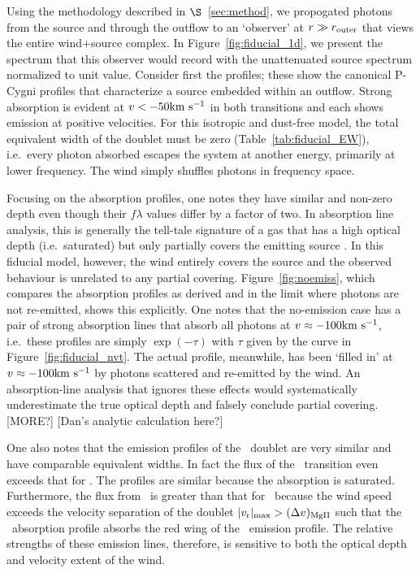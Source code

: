 \documentclass[12pt,preprint]{aastex}
\begin{document}
{Using the methodology described in $\S$~\ref{sec:method}, we
propogated photons from the source and through the outflow to an
`observer' at $r \gg r_{\rm outer}$ that views the entire wind+source
complex.  In Figure~\ref{fig:fiducial_1d}, we present the spectrum
that this observer would record with the unattenuated source spectrum
normalized to unit value.   Consider first the  profiles;
these show the canonical P-Cygni profiles that characterize a 
source embedded within an outflow.  Strong absorption is evident at
$v < -50 {\rm km~s^{-1}}$ in both transitions and each shows emission at
positive velocities.  For this isotropic and dust-free model, the
total equivalent width of the doublet must be zero
(Table~\ref{tab:fiducial_EW}), i.e.\ every photon
absorbed escapes the system at another energy, primarily at lower
frequency.  The wind simply shuffles photons in frequency space.

Focusing on the  absorption profiles, one notes they have
similar and non-zero depth even though their $f\lambda$ values differ
by a factor of two.  In absorption line analysis, this is generally
the tell-tale signature of a gas that has a high optical depth (i.e.\
saturated) but only partially covers the emitting source
\citep[e.g.][]{hamman10}.  In this fiducial model, however, the wind
entirely covers the source and the observed behaviour is unrelated to
any partial covering.  Figure~\ref{fig:noemiss}, which compares the
absorption profiles as derived and in the limit where photons are not
re-emitted, shows this explicitly.   One notes that the no-emission
case has a pair of strong absorption lines that absorb all photons at
$v \approx -100 {\rm km~s^{-1}}$, i.e.\ these profiles are simply $\exp(-\tau)$
with $\tau$ given by the curve in Figure~\ref{fig:fiducial_nvt}.  
The actual profile, meanwhile, has been `filled in' at $v \approx -100
{\rm km~s^{-1}}$ by photons scattered and re-emitted by the wind.  An
absorption-line analysis that ignores these effects
\citep[e.g.][]{sato} would systematically underestimate the true optical
depth and falsely conclude partial covering.  [MORE?]
[Dan's analytic calculation here?]

One also notes that the emission profiles of the \mgiid\ doublet
are very similar and have comparable equivalent widths.  In fact the
flux of the \mgiib\ transition even exceeds that for \mgiia.  The
profiles are similar because the absorption is saturated.
Furthermore, the flux from \mgiib\ is greater than that for
\mgiia\ because the wind speed exceeds the velocity separation
of the doublet $|v_{\rm r}|_{\rm max} > (\Delta v)_{\rm MgII}$ such
that the \mgiib\ absorption profile absorbs the red wing of the
\mgiia\ emission profile.  The relative strengths of these emission
lines, therefore, is sensitive to both the optical depth and velocity
extent of the wind.

}
\end{document}
